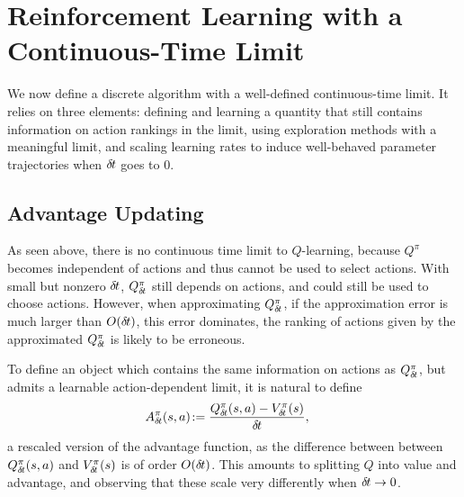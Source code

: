 \section{Reinforcement Learning with a Continuous-Time Limit}

We now define a discrete algorithm with a well-defined continuous-time
limit.  It relies on three elements: defining and learning a quantity
that still contains information on action rankings in the limit, using
exploration methods with a meaningful limit, and scaling learning rates
to induce well-behaved parameter trajectories when ${\delta\hspace{-.1em}t}$ goes to $0$.


\subsection{Advantage Updating}
\label{subsec:reparam}

As seen above, there is no continuous time limit to $Q$-learning, because
$Q^\pi$ becomes independent of actions and thus cannot be
used to select actions.  With small but nonzero ${\delta\hspace{-.1em}t}$,
$Q^\pi_{\delta\hspace{-.1em}t}$ still depends on actions, and could still be used to
choose actions. However, when
approximating $Q^\pi_{\delta\hspace{-.1em}t}$, if the approximation error is much larger
than $O({\delta\hspace{-.1em}t})$, this error dominates, the ranking of
actions given by the approximated $Q^\pi_{\delta\hspace{-.1em}t}$ is likely to be erroneous.

To define an object which contains the same information on actions as
$Q^\pi_{\delta\hspace{-.1em}t}$, but admits a learnable action-dependent limit, it is
natural to define \cite{adv_upd}
\begin{align}
	A^\pi_{\delta\hspace{-.1em}t}(s, a) &\colon\hspace{-.6em}= \frac{Q^\pi_{\delta\hspace{-.1em}t}(s,a) - V^\pi_{\delta\hspace{-.1em}t}(s)}{{\delta\hspace{-.1em}t}},
    \label{eq:adv}
\end{align}
a rescaled version of the advantage function, as the difference between between
$Q^\pi_{\delta\hspace{-.1em}t}(s, a)$ and $V^\pi_{\delta\hspace{-.1em}t}(s)$ is of order
$O({\delta\hspace{-.1em}t})$. This amounts to splitting $Q$ into value and advantage,
and observing that these scale very differently when ${\delta\hspace{-.1em}t}\to 0$.

